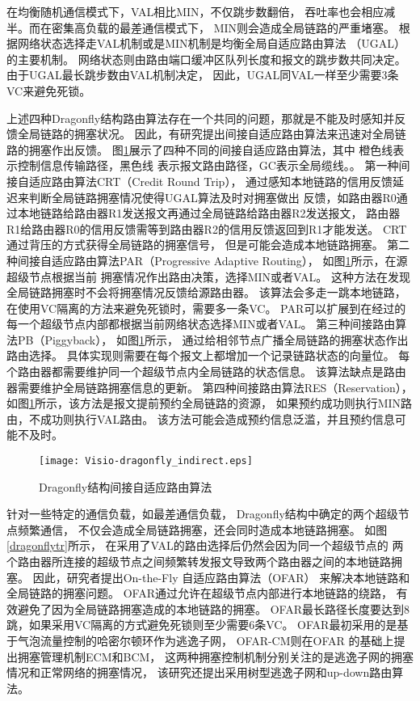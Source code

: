 在均衡随机通信模式下，VAL相比MIN，不仅跳步数翻倍，
吞吐率也会相应减半。而在密集高负载的最差通信模式下，
MIN则会造成全局链路的严重堵塞。
根据网络状态选择走VAL机制或是MIN机制是均衡全局自适应路由算法
（UGAL）的主要机制。
网络状态则由路由端口缓冲区队列长度和报文的跳步数共同决定。
由于UGAL最长跳步数由VAL机制决定，
因此，UGAL同VAL一样至少需要3条VC来避免死锁。

上述四种Dragonfly结构路由算法存在一个共同的问题，那就是不能及时感知并反馈全局链路的拥塞状况。
因此，有研究提出间接自适应路由算法来迅速对全局链路的拥塞作出反馈。
图\ref{dragonflyir}展示了四种不同的间接自适应路由算法，其中
橙色线表示控制信息传输路径，黑色线
表示报文路由路径，GC表示全局缆线。。
第一种间接自适应路由算法CRT（Credit Round Trip），
通过感知本地链路的信用反馈延迟来判断全局链路拥塞情况使得UGAL算法及时对拥塞做出
反馈，如路由器R0通过本地链路给路由器R1发送报文再通过全局链路给路由器R2发送报文，
路由器R1给路由器R0的信用反馈需等到路由器R2的信用反馈返回到R1才能发送。
CRT通过背压的方式获得全局链路的拥塞信号，
但是可能会造成本地链路拥塞。
第二种间接自适应路由算法PAR（Progressive Adaptive Routing），
如图\ref{dragonflyir}所示，在源超级节点根据当前
拥塞情况作出路由决策，选择MIN或者VAL。
这种方法在发现全局链路拥塞时不会将拥塞情况反馈给源路由器。
该算法会多走一跳本地链路，在使用VC隔离的方法来避免死锁时，需要多一条VC。
PAR可以扩展到在经过的每一个超级节点内部都根据当前网络状态选择MIN或者VAL。
第三种间接路由算法PB（Piggyback），
如图\ref{dragonflyir}所示，
通过给相邻节点广播全局链路的拥塞状态作出路由选择。
具体实现则需要在每个报文上都增加一个记录链路状态的向量位。
每个路由器都需要维护同一个超级节点内全局链路的状态信息。
该算法缺点是路由器需要维护全局链路拥塞信息的更新。
第四种间接路由算法RES（Reservation），
如图\ref{dragonflyir}所示，该方法是报文提前预约全局链路的资源，
如果预约成功则执行MIN路由，不成功则执行VAL路由。
该方法可能会造成预约信息泛滥，并且预约信息可能不及时。


\begin{figure}[htp]
  \centering
    \texttt{[image: Visio-dragonfly\_indirect.eps]}
    \caption{Dragonfly结构间接自适应路由算法}
       \label{dragonflyir}
\end{figure}

针对一些特定的通信负载，如最差通信负载，
Dragonfly结构中确定的两个超级节点频繁通信，
不仅会造成全局链路拥塞，还会同时造成本地链路拥塞。
如图\ref{dragonflytr}所示，
在采用了VAL的路由选择后仍然会因为同一个超级节点的
两个路由器所连接的超级节点之间频繁转发报文导致两个路由器之间的本地链路拥塞。
因此，研究者提出On-the-Fly 自适应路由算法（OFAR）
来解决本地链路和全局链路的拥塞问题。
OFAR通过允许在超级节点内部进行本地链路的绕路，
有效避免了因为全局链路拥塞造成的本地链路的拥塞。
OFAR最长路径长度要达到8跳，如果采用VC隔离的方式避免死锁则至少需要6条VC。
OFAR最初采用的是基于气泡流量控制的哈密尔顿环作为逃逸子网，
OFAR-CM则在OFAR 的基础上提出拥塞管理机制ECM和BCM，
这两种拥塞控制机制分别关注的是逃逸子网的拥塞情况和正常网络的拥塞情况，
该研究还提出采用树型逃逸子网和up-down路由算法。

